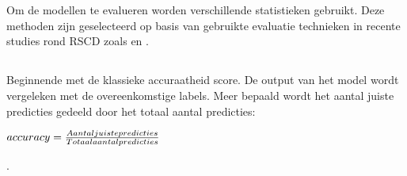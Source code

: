 
\chapter{}%
\label{ch:model-evaluatie}

Om de modellen te evalueren worden verschillende statistieken gebruikt. Deze methoden zijn geselecteerd op basis van gebruikte evaluatie 
technieken in recente studies rond RSCD zoals \textcite{Bandara2022} en \textcite{Han2023}. 

\section{}%
\label{sec:acuuraatheid-score}
Beginnende met de klassieke accuraatheid score. 
De output van het model wordt vergeleken met de overeenkomstige labels. Meer bepaald wordt het aantal juiste predicties gedeeld door het 
totaal aantal predicties: 
\newline
\begin{center} 
\( accuracy = \frac{Aantal \space juiste \space predicties}{Totaal \space aantal \space predicties}\) 
\end{center}.

